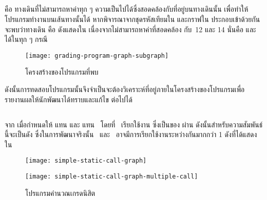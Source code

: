 {{%
\clearpage
\subsection{\FirstTimeDefine{\InfeasiblePath}{\InfeasiblePathEN}}

\InfeasiblePath คือ ทางเดินที่ไม่สามารถหาค่าทุก ๆ ความเป็นไปได้ซึ่งสอดคล้องกับ{\PredicateNode}ที่อยู่บนทางเดินนั้น 
เพื่อทำให้โปรแกรมทำงานบนเส้นทางนั้นได้ \cite{Naik2008} หากพิจารณาจากชุดรหัสเทียมใน{} 
และกราฟใน{} ประกอบเข้าด้วยกัน จะพบว่าทางเดิน 
 คือ {\bf \InfeasiblePath} 
ดังแสดงใน{} เนื่องจากไม่สามารถหาค่าที่สอดคล้อง กับ\PredicateNode\ 12 และ 14 
นั่นคือ  และ  ได้ในทุก ๆ กรณี

\begin{figure}[ht!]
    \centering
    \texttt{[image: grading-program-graph-subgraph]}
    \caption{โครงสร้างของโปรแกรมที่พบ{\InfeasiblePath}}
    \label{fig:infeasiblePath}
\end{figure}


ดังนั้นการทดสอบโปรแกรมนั้นจึงจำเป็นจะต้องวิเคราะห์{\InfeasiblePath}ที่อยู่ภายในโครงสร้างของโปรแกรมเพื่อรายงานผลให้นักพัฒนาได้ทราบและแก้ไข
ต่อไปได้

\subsection{\FirstTimeDefine{\scg}{\scgEN}}

จาก เมื่อกำหนดให้  แทน{\class}  และ  
แทน\class\  โดยที่\class\  เรียกใช้งาน{\method}  
ซึ่งเป็น{\method}ของ{\class}  ผ่าน{\method} {} ดังนั้น{\scg}สำหรับความสัมพันธ์นี้จะเป็นดัง
{} ซึ่งในการพัฒนาจริงนั้น\class\  และ\class\ 
อาจมีการเรียกใช้งานระหว่างกันมากกว่า 1 \method ดังที่ได้แสดงใน{}

\begin{figure}
    \begin{minipage}[t]{0.5\linewidth}
        \centering
        \texttt{[image: simple-static-call-graph]}
        \label{fig:subscggrading}
    \end{minipage}%
    \begin{minipage}[t]{0.5\linewidth}
        \centering
        \texttt{[image: simple-static-call-graph-multiple-call]}
        \label{fig:subactualscg}
    \end{minipage}%
    \caption{{\scg}โปรแกรมคำนวณเกรดนิสิต}
    \label{fig:scggrading}
\end{figure}

}}
